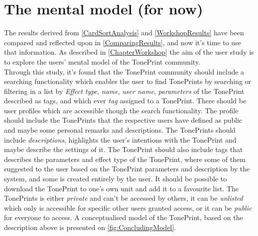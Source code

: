 \section{The mental model (for now)}
\label{MentalModelForNow}
The results derived from \autoref{CardSortAnalysis} and \autoref{WorkshopResults} have been compared and reflected upon in \autoref{ComparingResults}, and now it's time to use that information. As described in \autoref{ChapterWorkshop} the aim of the user study is to explore the users' mental model of the TonePrint community.\\ 
Through this study, it's found that the TonePrint community should include a searching functionality which enables the user to find TonePrints by searching or filtering in a list by \textit{Effect type}, \textit{name}, \textit{user name}, \textit{parameters} of the TonePrint described as tags, and which ever \textit{tag} assigned to a TonePrint. There should be user profiles which are accessible though the search functionality. The profile should include the TonePrints that the respective users have defined as public and maybe some personal remarks and descriptions. The TonePrints should include \textit{descriptions}, highlights the user's intentions with the TonePrint and maybe describe the settings of it. The TonePrint should also include tags that describes the parameters and effect type of the TonePrint, where some of them suggested to the user based on the TonePrint parameters and description by the system, and some is created entirely by the user. It should be possible to download the TonePrint to one's own unit and add it to a favourite list. The TonePrints is either \textit{private} and can't be accessed by others, it can be \textit{unlisted} which only is accessible for specific other users granted access, or it can be \textit{public} for everyone to access. A conceptualised model of the TonePrint, based on the description above is presented on \autoref{fig:ConcludingModel}.

